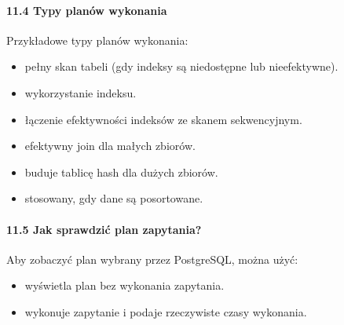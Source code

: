 \documentclass[letterpaper,10pt,polish]{sphinxmanual}
\begin{document}
\paragraph{11.4 Typy planów wykonania}
\label{\detokenize{rozdzial2/Konfiguracja_baz_danych/Konfiguracja_baz_danych:typy-planow-wykonania}}
\sphinxAtStartPar
Przykładowe typy planów wykonania:
\begin{itemize}
\item {} 
\sphinxAtStartPar
{} \textendash{} pełny skan tabeli (gdy indeksy są niedostępne lub nieefektywne).

\item {} 
\sphinxAtStartPar
{} \textendash{} wykorzystanie indeksu.

\item {} 
\sphinxAtStartPar
{} \textendash{} łączenie efektywności indeksów ze skanem sekwencyjnym.

\item {} 
\sphinxAtStartPar
{} \textendash{} efektywny join dla małych zbiorów.

\item {} 
\sphinxAtStartPar
{} \textendash{} buduje tablicę hash dla dużych zbiorów.

\item {} 
\sphinxAtStartPar
{} \textendash{} stosowany, gdy dane są posortowane.

\end{itemize}


\paragraph{11.5 Jak sprawdzić plan zapytania?}
\label{\detokenize{rozdzial2/Konfiguracja_baz_danych/Konfiguracja_baz_danych:jak-sprawdzic-plan-zapytania}}
\sphinxAtStartPar
Aby zobaczyć plan wybrany przez PostgreSQL, można użyć:

\begin{sphinxVerbatim}[commandchars=\\\{\}]
         
\end{sphinxVerbatim}
\begin{itemize}
\item {} 
\sphinxAtStartPar
{} \textendash{} wyświetla plan bez wykonania zapytania.

\item {} 
\sphinxAtStartPar
{} \textendash{} wykonuje zapytanie i podaje rzeczywiste czasy wykonania.

\end{itemize}
\end{document}
